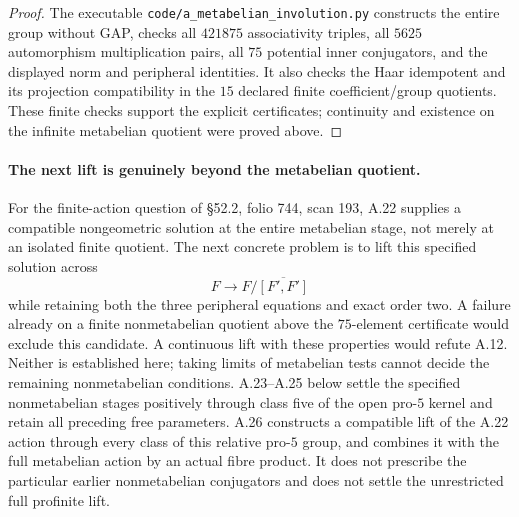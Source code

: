 \begin{proof}
The executable
\texttt{code/a\_metabelian\_involution.py} constructs
the entire group without GAP, checks all $421875$
associativity triples, all $5625$ automorphism
multiplication pairs, all $75$ potential inner
conjugators, and the displayed norm and peripheral
identities. It also checks the Haar idempotent and
its projection compatibility in the $15$ declared
finite coefficient/group quotients. These finite
checks support the explicit certificates; continuity
and existence on the infinite metabelian quotient
were proved above.
\end{proof}

\paragraph{The next lift is genuinely beyond the metabelian quotient.}
For the finite-action question of \S52.2, folio 744,
scan 193, A.22 supplies a compatible nongeometric
solution at the entire metabelian stage, not merely
at an isolated finite quotient. The next concrete
problem is to lift this specified solution across
\[
             F\longrightarrow
             F/\overline{[F',F']}
\]
while retaining both the three peripheral equations
and exact order two. A failure already on a finite
nonmetabelian quotient above the $75$-element certificate
would exclude this candidate. A continuous lift with
these properties would refute A.12. Neither is
established here; taking limits of metabelian tests
cannot decide the remaining nonmetabelian conditions.
A.23--A.25 below settle the specified nonmetabelian
stages positively through class five of the open
pro-$5$ kernel and retain all preceding free parameters.
A.26 constructs a compatible lift of the A.22 action
through every class of this relative pro-$5$ group,
and combines it with the full metabelian action by
an actual fibre product. It does not prescribe the
particular earlier nonmetabelian conjugators and
does not settle the unrestricted full profinite lift.
